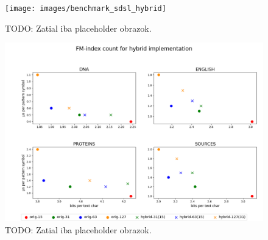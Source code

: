\begin{figure}
	\centerline{
		\texttt{[image: images/benchmark\_sdsl\_hybrid]}
	}
	\caption[TODO]{TODO: Zatial iba placeholder obrazok.
	}
	\label{obr:benchmark_sdsl_hybrid}
\end{figure}

\begin{figure}
	\centerline{
		\includegraphics[width=\textwidth, height=0.5\textheight]{images/vysledky_sdsl_hybrid_count}
	}
	\caption[TODO]{TODO: Zatial iba placeholder obrazok.
	}
	\label{obr:benchmark_sdsl_hybrid_count}
\end{figure}




